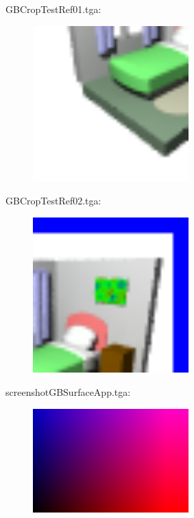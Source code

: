 GBCropTestRef01.tga:\\
\begin{center}
\begin{figure}[H]
\centering\includegraphics[width=6cm]{./GBCropTestRef01.png}\\
\end{figure}
\end{center}

GBCropTestRef02.tga:\\
\begin{center}
\begin{figure}[H]
\centering\includegraphics[width=6cm]{./GBCropTestRef02.png}\\
\end{figure}
\end{center}

screenshotGBSurfaceApp.tga:\\
\begin{center}
\begin{figure}[H]
\centering\includegraphics[width=6cm]{./screenshotGBSurfaceApp.png}\\
\end{figure}
\end{center}

